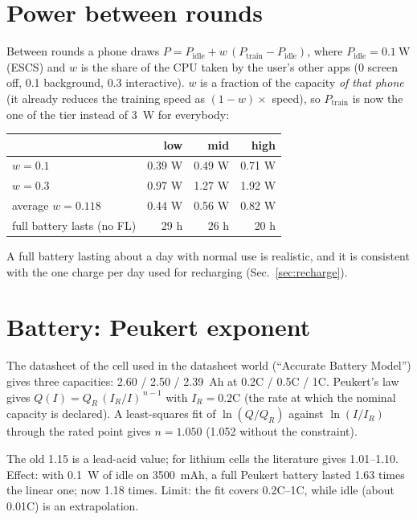 \documentclass[11pt,a4paper]{article}
\begin{document}
\section{Power between rounds}

Between rounds a phone draws
$P = P_\text{idle} + w\,(P_\text{train} - P_\text{idle})$, where
$P_\text{idle}=\SI{0.1}{\watt}$ (ESCS) and $w$ is the share of the CPU taken by
the user's other apps (0 screen off, 0.1 background, 0.3 interactive). $w$ is
a fraction of the capacity \emph{of that phone} (it already reduces the
training speed as $(1-w)\times$ speed), so $P_\text{train}$ is now the one of
the tier instead of \SI{3}{\watt} for everybody:

\begin{center}
\begin{tabular}{lrrr}
\toprule
& low & mid & high \\
\midrule
$w=0.1$ & 0.39 W & 0.49 W & 0.71 W \\
$w=0.3$ & 0.97 W & 1.27 W & 1.92 W \\
average $w=0.118$ & 0.44 W & 0.56 W & 0.82 W \\
full battery lasts (no FL) & 29 h & 26 h & 20 h \\
\bottomrule
\end{tabular}
\end{center}

A full battery lasting about a day with normal use is realistic, and it is
consistent with the one charge per day used for recharging (Sec.~\ref{sec:recharge}).

\section{Battery: Peukert exponent}

The datasheet of the cell used in the datasheet world (``Accurate Battery
Model'') gives three capacities: 2.60 / 2.50 / 2.39~Ah at 0.2C / 0.5C / 1C.
Peukert's law gives $Q(I) = Q_R\,(I_R/I)^{\,n-1}$ with $I_R = 0.2$C (the rate at
which the nominal capacity is declared). A least-squares fit of
$\ln(Q/Q_R)$ against $\ln(I/I_R)$ through the rated point gives
\textbf{$n = 1.050$} (1.052 without the constraint).

The old 1.15 is a lead-acid value; for lithium cells the literature gives
1.01--1.10. Effect: with \SI{0.1}{\watt} of idle on 3500~mAh, a full Peukert
battery lasted 1.63 times the linear one; now 1.18 times. Limit: the fit
covers 0.2C--1C, while idle (about 0.01C) is an extrapolation.
\end{document}
